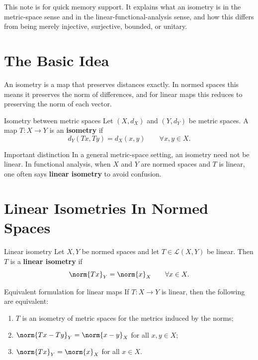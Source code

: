 \documentclass[header={Ancillary Note: Isometries},notheorems]{study-note}
\begin{document}

\vspace{0.8em}

\begin{focusbox}
This note is for quick memory support. It explains what an isometry is in the metric-space sense and in the linear-functional-analysis sense, and how this differs from being merely injective, surjective, bounded, or unitary.
\end{focusbox}

\tableofcontents

\section{The Basic Idea}

An isometry is a map that preserves distances exactly. In normed spaces this means it preserves the norm of differences, and for linear maps this reduces to preserving the norm of each vector.

\begin{defbox}{Isometry between metric spaces}
Let $(X,d_X)$ and $(Y,d_Y)$ be metric spaces. A map $T:X\to Y$ is an \textbf{isometry} if
\[
d_Y(Tx,Ty)=d_X(x,y)
\qquad \forall x,y\in X.
\]
\end{defbox}

\begin{warningbox}{Important distinction}
In a general metric-space setting, an isometry need not be linear. In functional analysis, when $X$ and $Y$ are normed spaces and $T$ is linear, one often says \textbf{linear isometry} to avoid confusion.
\end{warningbox}

\section{Linear Isometries In Normed Spaces}

\begin{defbox}{Linear isometry}
Let $X,Y$ be normed spaces and let $T\in\mathcal L(X,Y)$ be linear. Then $T$ is a \textbf{linear isometry} if
\[
\norm{Tx}_Y=\norm{x}_X
\qquad \forall x\in X.
\]
\end{defbox}

\begin{thmbox}{Equivalent formulation for linear maps}
If $T:X\to Y$ is linear, then the following are equivalent:
\begin{enumerate}
\item $T$ is an isometry of metric spaces for the metrics induced by the norms;
\item $\norm{Tx-Ty}_Y=\norm{x-y}_X$ for all $x,y\in X$;
\item $\norm{Tx}_Y=\norm{x}_X$ for all $x\in X$.
\end{enumerate}
\end{thmbox}
\end{document}
